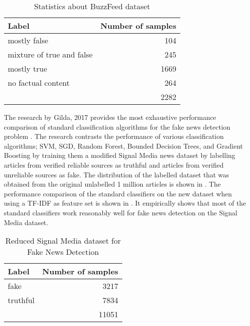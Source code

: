 \begin{table}[h]
\begin{center}
\caption{Statistics about BuzzFeed dataset}
\label{tbl:buzzfeed_dataset}
\begin{tabular}{lr}
\toprule 
Label&Number of samples \\
\midrule 
mostly false&104 \\
mixture of true and false&245 \\
mostly true&1669 \\
no factual content&264 \\
\midrule
&2282 \\
\bottomrule
\end{tabular}
\end{center}
\end{table}

The research by Gilda, 2017 provides the most exhaustive performance comparison of standard classification algorithms for the fake news detection problem \cite{gilda2017evaluating}. The research contrasts the performance of various classification algorithms; SVM, SGD, Random Forest, Bounded Decision Trees, and Gradient Boosting by training them a modified Signal Media news dataset \cite{corney2016million} by labelling articles from verified reliable sources as truthful and articles from verified unreliable sources as fake. The distribution of the labelled dataset that was obtained from the original unlabelled 1 million articles is shown in . The performance comparison of the standard classifiers on the new dataset when using a TF-IDF as feature set is shown in  \cite{gilda2017evaluating}. It empirically shows that most of the standard classifiers work reasonably well for fake news detection on the Signal Media dataset.

\begin{table}[h]
\begin{center}
\caption{Reduced Signal Media dataset for Fake News Detection}
\label{tbl:reduced_signal_media_dataset}
\begin{tabular}{lr}
\toprule 
Label&Number of samples \\
\midrule 
fake&3217 \\
truthful&7834 \\
\midrule
&11051 \\
\bottomrule
\end{tabular}
\end{center}
\end{table}

